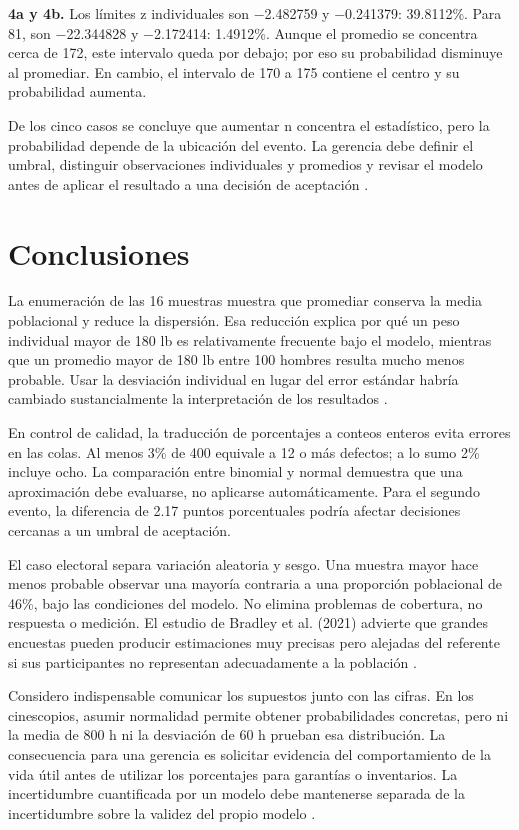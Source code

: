 {\textbf{4a y 4b.} Los límites z individuales son −2.482759 y −0.241379: 39.8112\%. Para 81, son −22.344828 y −2.172414: 1.4912\%. Aunque el promedio se concentra cerca de 172, este intervalo queda por debajo; por eso su probabilidad disminuye al promediar. En cambio, el intervalo de 170 a 175 contiene el centro y su probabilidad aumenta.

De los cinco casos se concluye que aumentar n concentra el estadístico, pero la probabilidad depende de la ubicación del evento. La gerencia debe definir el umbral, distinguir observaciones individuales y promedios y revisar el modelo antes de aplicar el resultado a una decisión de aceptación \citep{holmesBusiness2023,nistHandbook}.

\clearpage
\section{Conclusiones}
La enumeración de las 16 muestras muestra que promediar conserva la media poblacional y reduce la dispersión. Esa reducción explica por qué un peso individual mayor de 180 lb es relativamente frecuente bajo el modelo, mientras que un promedio mayor de 180 lb entre 100 hombres resulta mucho menos probable. Usar la desviación individual en lugar del error estándar habría cambiado sustancialmente la interpretación de los resultados \citep{holmesBusiness2023}.

En control de calidad, la traducción de porcentajes a conteos enteros evita errores en las colas. Al menos 3\% de 400 equivale a 12 o más defectos; a lo sumo 2\% incluye ocho. La comparación entre binomial y normal demuestra que una aproximación debe evaluarse, no aplicarse automáticamente. Para el segundo evento, la diferencia de 2.17 puntos porcentuales podría afectar decisiones cercanas a un umbral de aceptación.

El caso electoral separa variación aleatoria y sesgo. Una muestra mayor hace menos probable observar una mayoría contraria a una proporción poblacional de 46\%, bajo las condiciones del modelo. No elimina problemas de cobertura, no respuesta o medición. El estudio de Bradley et al. (2021) advierte que grandes encuestas pueden producir estimaciones muy precisas pero alejadas del referente si sus participantes no representan adecuadamente a la población \citep{bradley2021}.

Considero indispensable comunicar los supuestos junto con las cifras. En los cinescopios, asumir normalidad permite obtener probabilidades concretas, pero ni la media de 800 h ni la desviación de 60 h prueban esa distribución. La consecuencia para una gerencia es solicitar evidencia del comportamiento de la vida útil antes de utilizar los porcentajes para garantías o inventarios. La incertidumbre cuantificada por un modelo debe mantenerse separada de la incertidumbre sobre la validez del propio modelo \citep{nistHandbook}.

}
